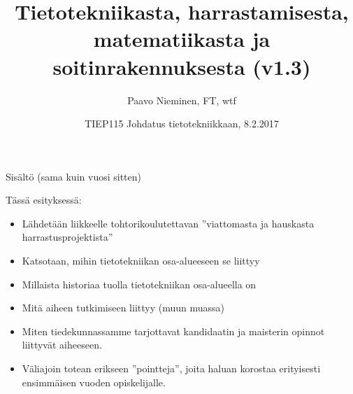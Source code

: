 \documentclass[pdf,9pt,handout]{beamer}
\title[TIEP115]
{Tietotekniikasta, harrastamisesta, matematiikasta ja soitinrakennuksesta (v1.3)}
\author{Paavo Nieminen, FT, wtf}
\date{TIEP115 Johdatus tietotekniikkaan, 8.2.2017}
\begin{document}
\begin{frame}
  \titlepage
\end{frame}

\begin{frame}{Sisältö (sama kuin vuosi sitten)}
    \begin{minipage}{\textwidth}
       \linespread{1.4}
       \tableofcontents
    \end{minipage}
\end{frame}
\beamerdefaultoverlayspecification{<+->}

\begin{frame}{Tässä esityksessä:}
  \begin{itemize}
  \item Lähdetään liikkeelle tohtorikoulutettavan ''viattomasta ja
    hauskasta harrastusprojektista''
  \item Katsotaan, mihin tietotekniikan osa-alueeseen se liittyy
  \item Millaista historiaa tuolla tietotekniikan osa-alueella on
  \item Mitä aiheen tutkimiseen liittyy (muun muassa)
  \item Miten tiedekunnassamme tarjottavat kandidaatin ja maisterin
    opinnot liittyvät aiheeseen.
  \item Väliajoin totean erikseen ''pointteja'', joita haluan korostaa
    erityisesti ensimmäisen vuoden opiskelijalle.
  \end{itemize}
\end{frame}
\end{document}
